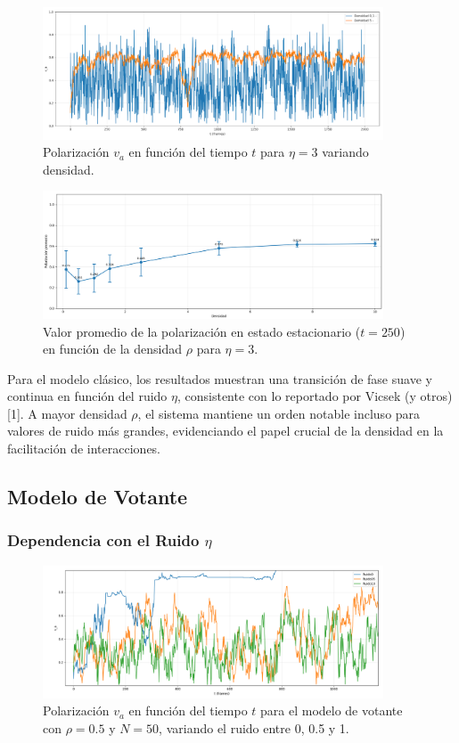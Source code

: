 \documentclass{article}
\begin{document}
\begin{figure}[H]
\centering
\includegraphics[width=0.9\textwidth]{19.png}
\caption{Polarización $v_a$ en función del tiempo $t$ para $\eta = 3$ variando densidad.}
\label{fig:19}
\end{figure}

\begin{figure}[H]
\centering
\includegraphics[width=0.9\textwidth]{20.png}
\caption{Valor promedio de la polarización en estado estacionario ($t = 250$) en función de la densidad $\rho$ para $\eta = 3$.}
\label{fig:20}
\end{figure}

Para el modelo clásico, los resultados muestran una transición de fase suave y continua en función del ruido $\eta$, consistente con lo reportado por Vicsek (y otros) [1]. A mayor densidad $\rho$, el sistema mantiene un orden notable incluso para valores de ruido más grandes, evidenciando el papel crucial de la densidad en la facilitación de interacciones.

\subsection{Modelo de Votante}
\subsubsection{Dependencia con el Ruido $\eta$}
\begin{figure}[H]
\centering
\includegraphics[width=0.9\textwidth]{Voter Densidad 0.5 Variando ruido.png}
\caption{Polarización $v_a$ en función del tiempo $t$ para el modelo de votante con $\rho = 0.5$ y $N = 50$, variando el ruido entre 0, 0.5 y 1.}
\label{fig:va_vs_eta_voter}
\end{figure}
\end{document}
